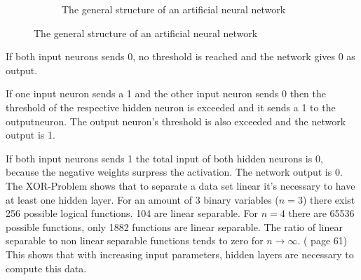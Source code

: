 \documentclass[10pt,a4paper,DIV=11]{scrreprt}
\begin{document}
\begin{figure}[H]
\begin{subfigure}[]{0.5\linewidth}
\begin{center}
					\caption{The general structure of an artificial neural network}
					\label{fig:xor-solution}
				\end{center}
			\end{subfigure}
\end{figure}

If both input neurons sends 0, no threshold is reached and the network gives 0 as output.

If one input neuron sends a 1 and the other input neuron sends 0 then the threshold of the respective hidden neuron is exceeded and it sends a 1 to the outputneuron. The  output neuron's threshold is also exceeded and the network output is 1.

If both input neurons sends 1 the total input of both hidden neurons is 0, because the negative weights surpress the activation. The network output is 0.\\




The XOR-Problem shows that to separate a data set linear it's necessary to have at least one hidden layer.
For an amount of 3 binary variables ($n=3$) there exist 256 possible logical functions. 104 are linear separable.
For $n=4$ there are 65536 possible functions, only 1882 functions are linear separable.
The ratio of linear separable to non linear separable functions tends to zero for $n \to \infty$. (\cite{rojas} page 61)
This shows that with increasing input parameters, hidden layers are necessary to compute this data.
\end{document}
